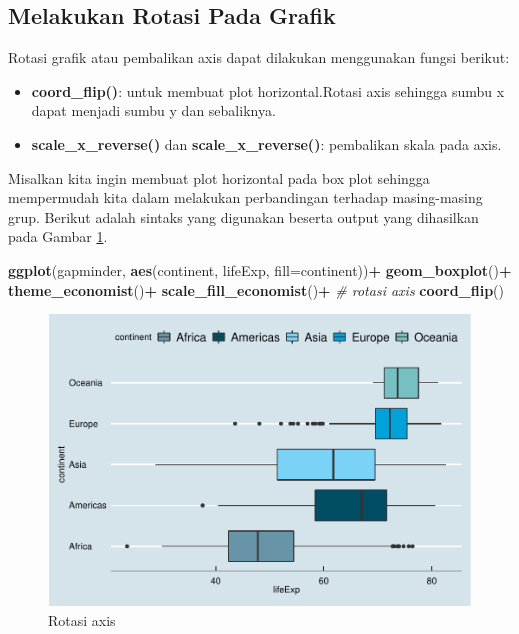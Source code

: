 \documentclass[]{book}
\newenvironment{Shaded}{\begin{snugshade}}{\end{snugshade}}
\newcommand{\KeywordTok}[1]{\textcolor[rgb]{0.13,0.29,0.53}{\textbf{#1}}}
\newcommand{\DataTypeTok}[1]{\textcolor[rgb]{0.13,0.29,0.53}{#1}}
\newcommand{\StringTok}[1]{\textcolor[rgb]{0.31,0.60,0.02}{#1}}
\newcommand{\CommentTok}[1]{\textcolor[rgb]{0.56,0.35,0.01}{\textit{#1}}}
\newcommand{\OperatorTok}[1]{\textcolor[rgb]{0.81,0.36,0.00}{\textbf{#1}}}
\newcommand{\NormalTok}[1]{#1}
\providecommand{\tightlist}{%
  \setlength{\itemsep}{0pt}\setlength{\parskip}{0pt}}
\begin{document}
\subsection{Melakukan Rotasi Pada
Grafik}\label{melakukan-rotasi-pada-grafik}

Rotasi grafik atau pembalikan axis dapat dilakukan menggunakan fungsi
berikut:

\begin{itemize}
\tightlist
\item
  \textbf{coord\_flip()}: untuk membuat plot horizontal.Rotasi axis
  sehingga sumbu x dapat menjadi sumbu y dan sebaliknya.
\item
  \textbf{scale\_x\_reverse()} dan \textbf{scale\_x\_reverse()}:
  pembalikan skala pada axis.
\end{itemize}

Misalkan kita ingin membuat plot horizontal pada box plot sehingga
mempermudah kita dalam melakukan perbandingan terhadap masing-masing
grup. Berikut adalah sintaks yang digunakan beserta output yang
dihasilkan pada Gambar \ref{fig:ggcoord}.

\begin{Shaded}
\begin{Highlighting}[]
\KeywordTok{ggplot}\NormalTok{(gapminder, }\KeywordTok{aes}\NormalTok{(continent, lifeExp, }
                      \DataTypeTok{fill=}\NormalTok{continent))}\OperatorTok{+}
\StringTok{  }\KeywordTok{geom_boxplot}\NormalTok{()}\OperatorTok{+}
\StringTok{  }\KeywordTok{theme_economist}\NormalTok{()}\OperatorTok{+}
\StringTok{  }\KeywordTok{scale_fill_economist}\NormalTok{()}\OperatorTok{+}
\StringTok{  }\CommentTok{# rotasi axis}
\StringTok{  }\KeywordTok{coord_flip}\NormalTok{()}
\end{Highlighting}
\end{Shaded}

\begin{figure}

{\centering \includegraphics[width=0.7\linewidth]{EnvStat_files/figure-latex/ggcoord-1} 

}

\caption{Rotasi axis}\label{fig:ggcoord}
\end{figure}
\end{document}

